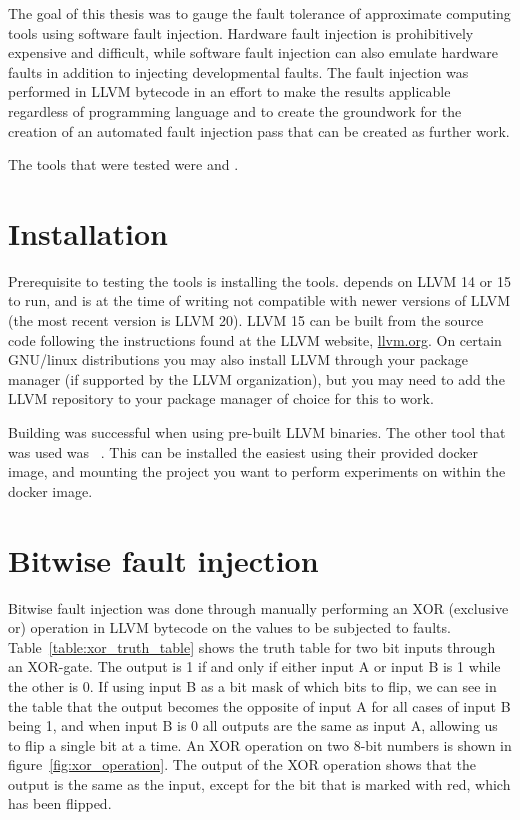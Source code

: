
The goal of this thesis was to gauge the fault tolerance of approximate computing tools using software fault injection. Hardware fault injection is prohibitively expensive and difficult, while software fault injection can also emulate hardware faults in addition to injecting developmental faults. The fault injection was performed in LLVM bytecode in an effort to make the results applicable regardless of programming language and to create the groundwork for the creation of an automated fault injection pass that can be created as further work.

The tools that were tested were \floatsmith{} and \taffo{}.

\section{Installation}
Prerequisite to testing the tools is installing the tools. \taffo{} depends on LLVM 14 or 15 to run, and is at the time of writing not compatible with newer versions of LLVM (the most recent version is LLVM 20). LLVM 15 can be built from the source code following the instructions found at the LLVM website, \url{llvm.org}. On certain GNU/linux distributions you may also install LLVM through your package manager (if supported by the LLVM organization), but you may need to add the LLVM repository  to your package manager of choice for this to work. 

Building \taffo{} was successful when using pre-built LLVM binaries. 
The other tool that was used was \floatsmith ~\citep{floatsmith_paper}. This can be installed the easiest using their provided docker image, and mounting the project you want to perform experiments on within the docker image.

\section{Bitwise fault injection}\label{section:bitwise_fault_injection}
Bitwise fault injection was done through manually performing an XOR (exclusive or) operation in LLVM bytecode on the values to be subjected to faults. Table~\ref{table:xor_truth_table} shows the truth table for two bit inputs through an XOR-gate. The output is 1 if and only if either input A or input B is 1 while the other is 0. If using input B as a bit mask of which bits to flip, we can see in the table that the output becomes the opposite of input A for all cases of input B being 1, and when input B is 0 all outputs are the same as input A, allowing us to flip a single bit at a time. An XOR operation on two 8-bit numbers is shown in figure~\ref{fig:xor_operation}. The output of the XOR operation shows that the output is the same as the input, except for the bit that is marked with red, which has been flipped.

